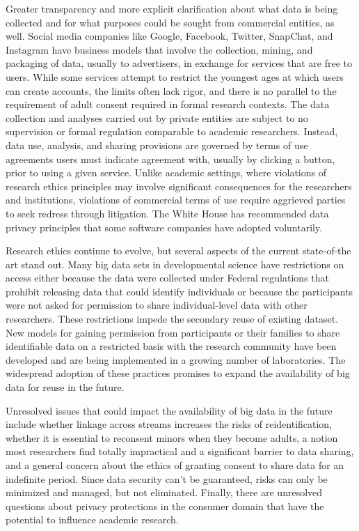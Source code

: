 \documentclass[letterpaper,man,apacite]{apa6}
\begin{document}
Greater transparency and more explicit clarification about what data is being collected and for what purposes could be sought from commercial entities, as well.
Social media companies like Google, Facebook, Twitter, SnapChat, and Instagram have business models that involve the collection, mining, and packaging of data, usually to advertisers, in exchange for services that are free to users.
While some services attempt to restrict the youngest ages at which users can create accounts, the limits often lack rigor, and there is no parallel to the requirement of adult consent required in formal research contexts.
The data collection and analyses carried out by private entities are subject to no supervision or formal regulation comparable to academic researchers.
Instead, data use, analysis, and sharing provisions are governed by terms of use agreements users must indicate agreement with, usually by clicking a button, prior to using a given service.
Unlike academic settings, where violations of research ethics principles may involve significant consequences for the researchers and institutions, violations of commercial terms of use require aggrieved parties to seek redress through litigation.
The White House has recommended data privacy principles \cite{data-privacy-networked-world} that some software companies have adopted voluntarily.

Research ethics continue to evolve, but several aspects of the current state-of-the art stand out.
Many big data sets in developmental science have restrictions on access either because the data were collected under Federal regulations that prohibit releasing data that could identify individuals or because the participants were not asked for permission to share individual-level data with other researchers.
These restrictions impede the secondary reuse of existing dataset.
New models for gaining permission from participants or their families to share identifiable data on a restricted basis with the research community have been developed and are being implemented in a growing number of laboratories.
The widespread adoption of these practices promises to expand the availability of big data for reuse in the future.

Unresolved issues that could impact the availability of big data in the future include whether linkage across streams increases the risks of reidentification, whether it is essential to reconsent minors when they become adults, a notion most researchers find totally impractical and a significant barrier to data sharing, and a general concern about the ethics of granting consent to share data for an indefinite period.
Since data security can't be guaranteed, risks can only be minimized and managed, but not eliminated.
Finally, there are unresolved questions about privacy protections in the consumer domain that have the potential to influence academic research.
\end{document}
